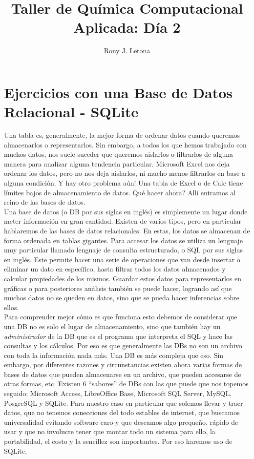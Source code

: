 \documentclass[10pt,letterpaper]{article}
\author{Rony J. Letona}
\title{Taller de Qu\'imica Computacional Aplicada: D\'ia 2}
\begin{document}
\maketitle

\section{Ejercicios con una Base de Datos Relacional - SQLite}
Una tabla es, generalmente, la mejor forma de ordenar datos cuando queremos almacenarlos o representarlos. Sin embargo, a todos los que hemos trabajado con muchos datos, nos suele suceder que queremos aislarlos o filtrarlos de alguna manera para analizar alguna tendencia particular. Microsoft Excel nos deja ordenar los datos, pero no nos deja aislarlos, ni mucho menos filtrarlos en base a alguna condici\'on. Y hay otro problema a\'un! Una tabla de Excel o de Calc tiene l\'imites bajos de almacenamiento de datos. Qu\'e hacer ahora? All\'i entramos al reino de las bases de datos.\\

Una base de datos (o DB por sus siglas en ingl\'es) es simplemente un lugar donde meter informaci\'on en gran cantidad. Existen de varios tipos, pero en particular hablaremos de las bases de datos relacionales. En estas, los datos se almacenan de forma ordenada en tablas gigantes. Para accesar los datos se utiliza un lenguaje muy particular llamado lenguaje de consulta estructurado, o SQL por sus siglas en ingl\'es. Este permite hacer una serie de operaciones que van desde insertar o eliminar un dato en espec\'ifico, hasta filtrar todos los datos almacenados y calcular propiedades de los mismos. Guardar estos datos para representarlos en gr\'aficas o para posteriores an\'alisis tambi\'en se puede hacer, logrando as\'i que muchos datos no se queden en datos, sino que se pueda hacer inferencias sobre ellos.\\

Para comprender mejor c\'omo es que funciona esto debemos de considerar que una DB no es solo el lugar de almacenamiento, sino que tambi\'en hay un \emph{administrador} de la DB que es el programa que interpreta el SQL y hace las consultas y los c\'alculos. Por eso es que generalmente las DBs no son un archivo con toda la informaci\'on nada m\'as. Una DB es m\'as compleja que eso. Sin embargo, por diferentes razones y circunstancias existen ahora varias formas de bases de datos que pueden almacenarse en un archivo, que pueden accesarse de otras formas, etc. Existen 6 ``sabores'' de DBs con las que puede que nos topemos seguido: Microsoft Access, LibreOffice Base, Microsoft SQL Server, MySQL, PosgreSQL y SQLite. Para nuestro caso en particular que solemos llevar y traer datos, que no tenemos conecciones del todo estables de internet, que buscamos universalidad evitando software caro y que deseamos algo preque\~no, r\'apido de usar y que no involucre tener que montar todo un sistema para ello, la portabilidad, el costo y la sencillez son importantes. Por eso haremos uso de SQLite.
\newpage
\end{document}
